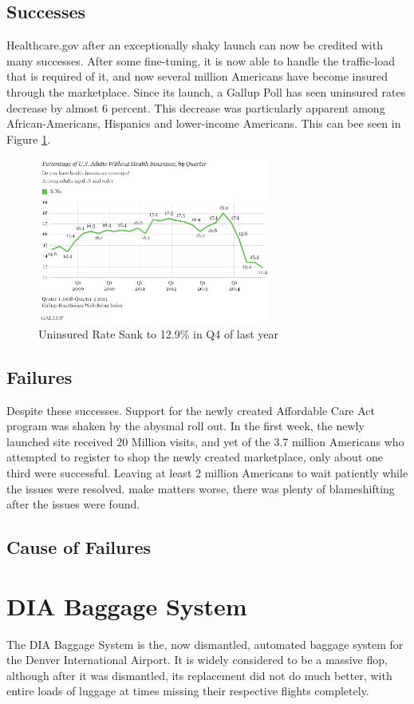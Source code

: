 \documentclass[conference]{IEEEtran}
\begin{document}
	\subsection{Successes}
	Healthcare.gov after an exceptionally shaky launch can now be credited with many successes. After some fine-tuning, it is now able to handle the traffic-load that is required of it, and now several million Americans have become insured through the marketplace. Since its launch, a Gallup Poll has seen uninsured rates decrease by almost 6 percent. This decrease was particularly apparent among African-Americans, Hispanics and lower-income Americans. This can bee seen in Figure \ref{fig:uninsured-percent}. \cite{hc_gallup} 
	\begin{figure}[h]
		\begin{center}
			\includegraphics[width=3in]{graph-healthcare-percentage.png}
		\end{center}
		\caption{Uninsured Rate Sank to 12.9\% in Q4 of last year}
		\label{fig:uninsured-percent}
	\end{figure}
	\subsection{Failures}
	Despite these successes. Support for the newly created Affordable Care Act program was shaken by the abysmal roll out. In the first week, the newly launched site received 20 Million visits, and yet of the 3.7 million Americans who attempted to register to shop the newly created marketplace, only about one third were successful. Leaving at least 2 million Americans to wait patiently while the issues were resolved. \cite{hc_informationweek}  make matters worse, there was plenty of blameshifting after the issues were found. 
	\subsection{Cause of Failures}

\section{DIA Baggage System}
	The DIA Baggage System is the, now dismantled, automated baggage system for the Denver International Airport. It is widely considered to be a massive flop, although after it was dismantled, its replacement did not do much better, with entire loads of luggage at times missing their respective flights completely. \cite{dia_denverpost} 
\end{document}
